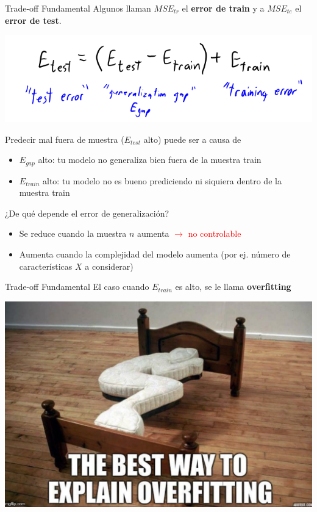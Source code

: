 \documentclass[11pt,handout,aspectratio=169]{beamer}
\begin{document}
\begin{frame}{Trade-off Fundamental}
Algunos llaman $MSE_{tr}$ el \textbf{error de train} y a $MSE_{te}$ el \textbf{error de test}.

\begin{center}
\includegraphics[scale=0.5]{fundamental_tradeoff.png}
\end{center}

Predecir mal fuera de muestra ($E_{test}$ alto) puede ser a causa de 
\begin{itemize}
\item $E_{gap}$ alto: tu modelo no generaliza bien fuera de la muestra train 
\item  $E_{train}$ alto: tu modelo no es bueno prediciendo ni siquiera dentro de la muestra train 
\end{itemize}
\vspace{0.8cm}
¿De qué depende el error de generalización?
\begin{itemize}
\item Se reduce cuando la muestra $n$ aumenta  \textcolor{red}{$\rightarrow$ no controlable}
\item Aumenta cuando la complejidad del modelo aumenta (por ej. número de características $X$ a considerar)
\end{itemize}
\end{frame}

\begin{frame}{Trade-off Fundamental}
El caso cuando $E_{train}$ es alto, se le llama \textbf{overfitting}

\begin{center}
\includegraphics[scale=0.3]{overfit.png}
\end{center}
\end{frame}
\end{document}
